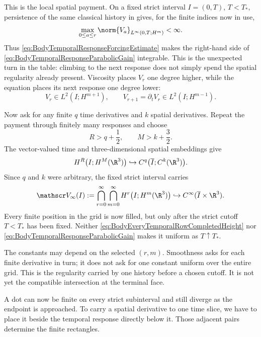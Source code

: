 This is the local spatial payment.  On a fixed strict interval
\(I=(0,T)\), \(T<T_*\), persistence of the same classical history in
 gives, for the finite indices now in use,
\begin{equation}\label{eq:BodyStrictIntervalResponseBound}
  \max_{0\leq a\leq r}
  \norm{V_a}_{L^\infty(0,T;H^m)}<\infty.
\end{equation}
Thus \eqref{eq:BodyTemporalResponseForcingEstimate} makes the right-hand side
of \eqref{eq:BodyTemporalResponseParabolicGain} integrable.  This is the
unexpected turn in the table: climbing to the next response does not simply
spend the spatial regularity already present.  Viscosity places \(V_r\) one
degree higher, while the equation places its next response one degree lower:
\begin{equation}\label{eq:BodyStrictIntervalAdjacentResponsePair}
  V_r\in L^2(I;H^{m+1}),
  \qquad
  V_{r+1}=\partial_tV_r\in L^2(I;H^{m-1}).
\end{equation}

Now ask for any finite \(q\) time derivatives and \(k\) spatial derivatives.
Repeat the payment through finitely many responses and choose
\[
  R>q+\frac12,
  \qquad
  M>k+\frac32.
\]
The vector-valued time and three-dimensional spatial embeddings
\parencite[Theorem~7.28]{Cerda2010} give
\[
  H^R\bigl(I;H^M(\R^3)\bigr)
  \hookrightarrow
  C^q\bigl(\overline I;C^k(\R^3)\bigr).
\]
Since \(q\) and \(k\) were arbitrary, the fixed strict interval carries
\begin{equation}\label{eq:BodyFormalMixedIntersection}
  \mathscr V_\infty(I)
  :=\bigcap_{r=0}^{\infty}\bigcap_{m=0}^{\infty}
  H^r\bigl(I;H^m(\R^3)\bigr)
  \hookrightarrow C^\infty(\overline I\times\R^3).
\end{equation}
Every finite position in the grid is now filled, but only after the strict
cutoff \(T<T_*\) has been fixed.  Neither
\eqref{eq:BodyEveryTemporalRowCompletedHeight} nor
\eqref{eq:BodyTemporalResponseParabolicGain} makes it uniform as
\(T\uparrow T_*\).

The constants may depend on the selected \((r,m)\).  Smoothness asks for each
finite derivative in turn; it does not ask for one constant uniform over the
entire grid.  This is the regularity carried by one history before a chosen
cutoff.  It is not yet the compatible intersection at the terminal face.

A dot can now be finite on every strict subinterval and still diverge as the
endpoint is approached.  To carry a spatial derivative to one time slice, we
have to place it beside the temporal response directly below it.  Those
adjacent pairs determine the finite rectangles.
